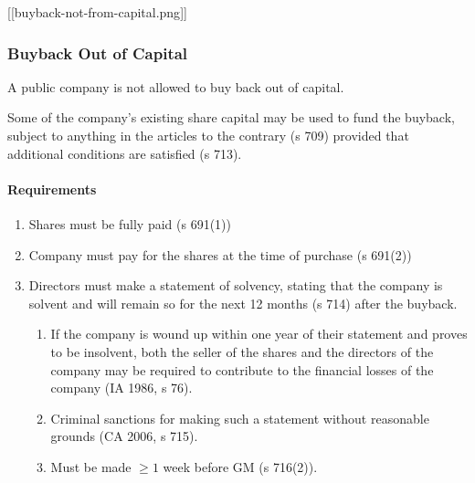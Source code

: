 \documentclass[
]{article}
\newenvironment{Shaded}{}{}
\newcommand{\NormalTok}[1]{#1}
\providecommand{\tightlist}{%
  \setlength{\itemsep}{0pt}\setlength{\parskip}{0pt}}
\begin{document}
{[}{[}buyback-not-from-capital.png{]}{]}

\hypertarget{buyback-out-of-capital}{%
\subsubsection{Buyback Out of Capital}\label{buyback-out-of-capital}}

\begin{Shaded}
\begin{Highlighting}[]
\NormalTok{A public company is not allowed to buy back out of capital.}
\end{Highlighting}
\end{Shaded}

Some of the company's existing share capital may be used to fund the
buyback, subject to anything in the articles to the contrary (s 709)
provided that additional conditions are satisfied (s 713).

\hypertarget{requirements}{%
\paragraph{Requirements}\label{requirements}}

\begin{enumerate}
\def\labelenumi{\arabic{enumi}.}
\tightlist
\item
  Shares must be fully paid (s 691(1))
\item
  Company must pay for the shares at the time of purchase (s 691(2))
\item
  Directors must make a statement of solvency, stating that the company
  is solvent and will remain so for the next 12 months (s 714) after the
  buyback.

  \begin{enumerate}
  \def\labelenumii{\arabic{enumii}.}
  \tightlist
  \item
    If the company is wound up within one year of their statement and
    proves to be insolvent, both the seller of the shares and the
    directors of the company may be required to contribute to the
    financial losses of the company (IA 1986, s 76).
  \item
    Criminal sanctions for making such a statement without reasonable
    grounds (CA 2006, s 715).
  \item
    Must be made \(\geq 1\) week before GM (s 716(2)).
  \end{enumerate}
\end{enumerate}
\end{document}
